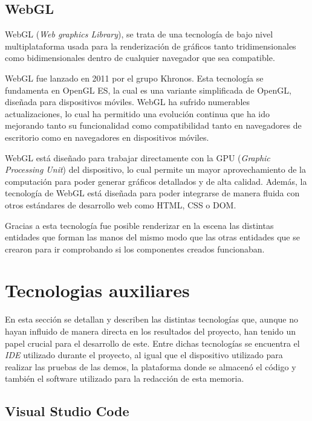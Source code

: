 \documentclass[a4paper, 12pt]{book}
\begin{document}
\subsection{WebGL}
\label{subsec:WebGL}
WebGL \cite{webgl_encodebiz} (\textit{Web graphics Library}), se trata de una tecnología de bajo nivel multiplataforma usada para la renderización de gráficos tanto tridimensionales como bidimensionales dentro de cualquier navegador que sea compatible.

WebGL fue lanzado en 2011 por el grupo Khronos. Esta tecnología se fundamenta en OpenGL ES, la cual es una variante simplificada de OpenGL, diseñada para dispositivos móviles. WebGL ha sufrido numerables actualizaciones, 
lo cual ha permitido una evolución continua que ha ido mejorando tanto su funcionalidad como compatibilidad tanto en navegadores de escritorio como en navegadores en dispositivos móviles. 

WebGL está diseñado para trabajar directamente con la GPU (\textit{Graphic Processing Unit}) del dispositivo, lo cual permite un mayor aprovechamiento de la computación para poder generar gráficos detallados y de alta calidad. 
Además, la tecnología de WebGL está diseñada para poder integrarse de manera fluida con otros estándares de desarrollo web como HTML, CSS o DOM. 

Gracias a esta tecnología fue posible renderizar en la escena las distintas entidades que forman las manos del mismo modo que las otras entidades que se crearon para ir comprobando si los componentes creados funcionaban.

\section{Tecnologias auxiliares}
\label{sec:tecnologias-auxiliares}
En esta sección se detallan y describen las distintas tecnologías que, aunque no hayan influido de manera directa en los resultados del proyecto, han tenido un papel crucial para el desarrollo de este.
Entre dichas tecnologías se encuentra el \textit{IDE} utilizado durante el proyecto, al igual que el dispositivo utilizado para realizar las pruebas de las demos, la plataforma donde se almacenó el código y también el software utilizado para la redacción de esta memoria.

\subsection{Visual Studio Code}
\label{subsec: visualstudiocode}
\end{document}
